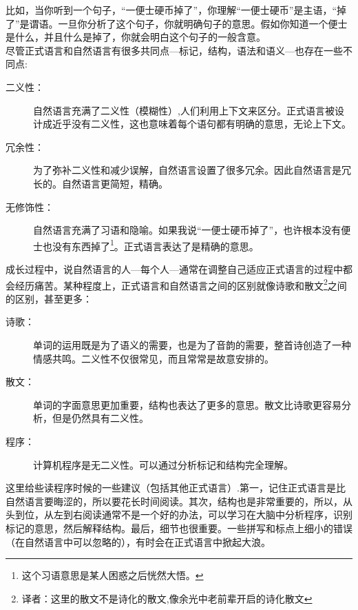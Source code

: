 
比如，当你听到一个句子，“一便士硬币掉了”，你理解“一便士硬币”是主语，“掉了”是谓语。一旦你分析了这个句子，你就明确句子的意思。假如你知道一个便士是什么，并且什么是掉了，你就会明白这个句子的一般含意。\\

尽管正式语言和自然语言有很多共同点---标记，结构，语法和语义---也存在一些不同点:


\begin{description}

\item[二义性：]自然语言充满了二义性（模糊性）,人们利用上下文来区分。正式语言被设计成近乎没有二义性，这也意味着每个语句都有明确的意思，无论上下文。

\item[冗余性：]为了弥补二义性和减少误解，自然语言设置了很多冗余。因此自然语言是冗长的。自然语言更简短，精确。

\item[无修饰性：]自然语言充满了习语和隐喻。如果我说“一便士硬币掉了”，也许根本没有便士也没有东西掉了\footnote{这个习语意思是某人困惑之后恍然大悟。}。正式语言表达了是精确的意思。

\end{description}

成长过程中，说自然语言的人---每个人---通常在调整自己适应正式语言的过程中都会经历痛苦。某种程度上，正式语言和自然语言之间的区别就像诗歌和散文\footnote{译者：这里的散文不是诗化的散文,像余光中老前辈开启的诗化散文}之间的区别，甚至更多：


\begin{description}

\item[诗歌：]单词的运用既是为了语义的需要，也是为了音韵的需要，整首诗创造了一种情感共鸣。二义性不仅很常见，而且常常是故意安排的。

\item[散文：]单词的字面意思更加重要，结构也表达了更多的意思。散文比诗歌更容易分析，但是仍然具有二义性。

\item[程序：]计算机程序是无二义性。可以通过分析标记和结构完全理解。


\end{description}

这里给些读程序时候的一些建议（包括其他正式语言）.第一，记住正式语言是比自然语言要晦涩的，所以要花长时间阅读。其次，结构也是非常重要的，所以，从头到位，从左到右阅读通常不是一个好的办法，可以学习在大脑中分析程序，识别标记的意思，然后解释结构。最后，细节也很重要。一些拼写和标点上细小的错误（在自然语言中可以忽略的），有时会在正式语言中掀起大浪。

